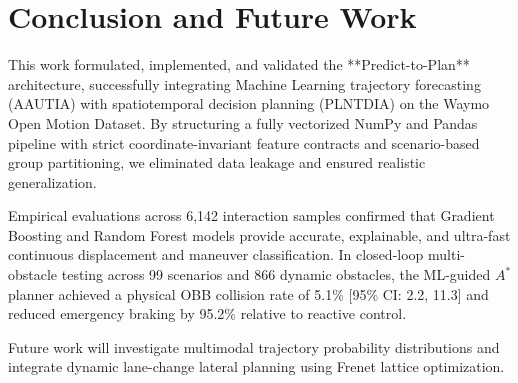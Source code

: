 \documentclass[runningheads]{llncs}
\begin{document}
%
%
%
\section{Conclusion and Future Work}
\label{sec:conclusion}
This work formulated, implemented, and validated the **Predict-to-Plan** architecture, successfully integrating Machine Learning trajectory forecasting (AAUTIA) with spatiotemporal decision planning (PLNTDIA) on the Waymo Open Motion Dataset. By structuring a fully vectorized NumPy and Pandas pipeline with strict coordinate-invariant feature contracts and scenario-based group partitioning, we eliminated data leakage and ensured realistic generalization.

Empirical evaluations across 6,142 interaction samples confirmed that Gradient Boosting and Random Forest models provide accurate, explainable, and ultra-fast continuous displacement and maneuver classification. In closed-loop multi-obstacle testing across 99 scenarios and 866 dynamic obstacles, the ML-guided $A^*$ planner achieved a physical OBB collision rate of 5.1\% [95\% CI: 2.2, 11.3] and reduced emergency braking by 95.2\% relative to reactive control.

Future work will investigate multimodal trajectory probability distributions and integrate dynamic lane-change lateral planning using Frenet lattice optimization.

%
%


\end{document}
